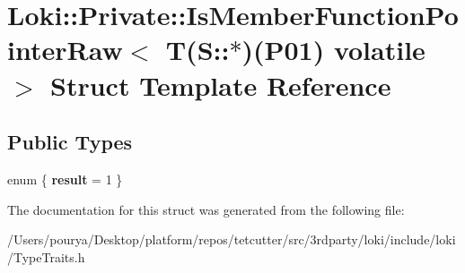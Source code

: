 \hypertarget{structLoki_1_1Private_1_1IsMemberFunctionPointerRaw_3_01T_07S_1_1_5_08_07P01_08_01volatile_01_4}{}\section{Loki\+:\+:Private\+:\+:Is\+Member\+Function\+Pointer\+Raw$<$ T(S\+:\+:$\ast$)(P01) volatile $>$ Struct Template Reference}
\label{structLoki_1_1Private_1_1IsMemberFunctionPointerRaw_3_01T_07S_1_1_5_08_07P01_08_01volatile_01_4}
\subsection*{Public Types}
\begin{DoxyCompactItemize}
\item 
\hypertarget{structLoki_1_1Private_1_1IsMemberFunctionPointerRaw_3_01T_07S_1_1_5_08_07P01_08_01volatile_01_4_a97de5249a5816e6f6866e52a3bb8852f}{}enum \{ {\bfseries result} = 1
 \}\label{structLoki_1_1Private_1_1IsMemberFunctionPointerRaw_3_01T_07S_1_1_5_08_07P01_08_01volatile_01_4_a97de5249a5816e6f6866e52a3bb8852f}

\end{DoxyCompactItemize}


The documentation for this struct was generated from the following file\+:\begin{DoxyCompactItemize}
\item 
/\+Users/pourya/\+Desktop/platform/repos/tetcutter/src/3rdparty/loki/include/loki/Type\+Traits.\+h\end{DoxyCompactItemize}
